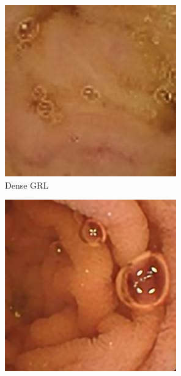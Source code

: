 \begin{figure}[H]
  \begin{subfigure}[b]{0.32\textwidth}
    \includegraphics[width=\textwidth]{Chapter7/dense_grl_9.jpg}
    \caption{Dense GRL}
  \end{subfigure}
  \begin{subfigure}[b]{0.32\textwidth}
    \includegraphics[width=\textwidth]{Chapter7/Dense_445.jpg}

\end{subfigure}
\end{figure}
